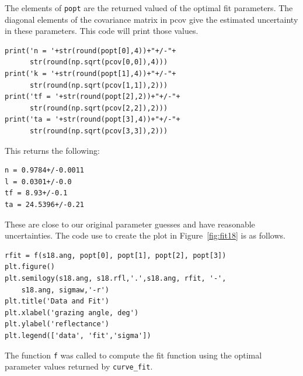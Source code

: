 \documentclass[english]{scrartcl}
\begin{document}
The elements of \texttt{popt} are the returned valued of the
optimal fit parameters. The diagonal elements of the covariance matrix
in pcov give the estimated uncertainty in these parameters. This
code will print those values.
\begin{lstlisting}
print('n = '+str(round(popt[0],4))+"+/-"+
      str(round(np.sqrt(pcov[0,0]),4)))
print('k = '+str(round(popt[1],4))+"+/-"+
      str(round(np.sqrt(pcov[1,1]),2)))
print('tf = '+str(round(popt[2],2))+"+/-"+
      str(round(np.sqrt(pcov[2,2]),2)))
print('ta = '+str(round(popt[3],4))+"+/-"+
      str(round(np.sqrt(pcov[3,3]),2)))
\end{lstlisting}
This returns the following:
\begin{lstlisting}
n = 0.9784+/-0.0011
l = 0.0301+/-0.0
tf = 8.93+/-0.1
ta = 24.5396+/-0.21
\end{lstlisting}
These are close to our original parameter guesses and have reasonable
uncertainties.
The code use to create the plot in Figure~\ref{fig:fit18} is as follows.
\begin{lstlisting}
rfit = f(s18.ang, popt[0], popt[1], popt[2], popt[3])
plt.figure()
plt.semilogy(s18.ang, s18.rfl,'.',s18.ang, rfit, '-',
	s18.ang, sigmaw,'-r')
plt.title('Data and Fit')
plt.xlabel('grazing angle, deg')
plt.ylabel('reflectance')
plt.legend(['data', 'fit','sigma'])
\end{lstlisting}
The function \texttt{f} was called to compute the fit function using the optimal parameter values returned by \texttt{curve\_fit}.
\end{document}
